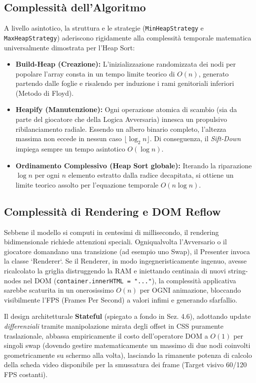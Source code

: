 \documentclass[openany]{theme/uniprthesis}
\begin{document}
\subsection{Complessità dell'Algoritmo}
A livello asintotico, la struttura e le strategie (\texttt{MinHeapStrategy} e \texttt{MaxHeapStrategy}) aderiscono rigidamente alla complessità temporale matematica universalmente dimostrata per l'Heap Sort:
\begin{itemize}
    \item \textbf{Build-Heap (Creazione):} L'inizializzazione randomizzata dei nodi per popolare l'array consta in un tempo limite teorico di $O(n)$, generato partendo dalle foglie e risalendo per induzione i rami genitoriali inferiori (Metodo di Floyd).
    \item \textbf{Heapify (Manutenzione):} Ogni operazione atomica di scambio (sia da parte del giocatore che della Logica Avversaria) innesca un propulsivo ribilanciamento radiale. Essendo un albero binario completo, l'altezza massima non eccede in nessun caso $\lfloor \log_2 n \rfloor$. Di conseguenza, il \textit{Sift-Down} impiega sempre un tempo asintotico $O(\log n)$.
    \item \textbf{Ordinamento Complessivo (Heap Sort globale):} Iterando la riparazione $\log n$ per ogni $n$ elemento estratto dalla radice decapitata, si ottiene un limite teorico assolto per l'equazione temporale $O(n \log n)$. 
\end{itemize}

\subsection{Complessità di Rendering e DOM Reflow}
Sebbene il modello si computi in centesimi di millisecondo, il rendering bidimensionale richiede attenzioni speciali. Ogniqualvolta l'Avversario o il giocatore domandano una transizione (ad esempio uno Swap), il Presenter invoca la classe `Renderer`.
Se il Renderer, in modo ingegneristicamente ingenuo, avesse ricalcolato la griglia distruggendo la RAM e iniettando centinaia di nuovi string-nodes nel DOM (\texttt{container.innerHTML = "..."}), la complessità applicativa sarebbe scaturita in un onerosissimo $O(n)$ per OGNI animazione, bloccando visibilmente l'FPS (Frames Per Second) a valori infimi e generando sfarfallio.

Il design architetturale \textbf{Stateful} (spiegato a fondo in Sez. 4.6), adottando update \textit{differenziali} tramite manipolazione mirata degli offset in CSS puramente traslazionale, abbassa empiricamente il costo dell'operatore DOM a $O(1)$ per singoli swap (dovendo gestire matematicamente un massimo di due nodi coinvolti geometricamente su schermo alla volta), lasciando la rimanente potenza di calcolo della scheda video disponibile per la smussatura dei frame (Target visivo 60/120 FPS costanti).
\end{document}
